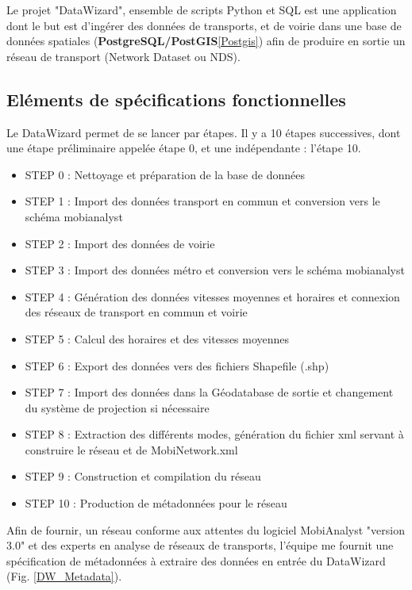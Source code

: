\begin{itemize}
Le projet "DataWizard", ensemble de scripts Python et SQL est une application dont le but est d'ingérer des données de transports, et de voirie dans une base de données spatiales (\textbf{PostgreSQL/PostGIS}\ref{Postgis}) afin de produire en sortie un réseau de transport (Network Dataset ou NDS).\\


\subsection{Eléments de spécifications fonctionnelles}

Le DataWizard permet de se lancer par étapes. Il y a 10 étapes successives, dont une étape préliminaire appelée étape 0, et une indépendante : l'étape 10.
\begin{itemize}
\item STEP 0 : Nettoyage et préparation de la base de données
\item STEP 1 : Import des données transport en commun et conversion vers le schéma mobianalyst
\item STEP 2 : Import des données de voirie
\item STEP 3 : Import des données métro et conversion vers le schéma mobianalyst
\item STEP 4 : Génération des données vitesses moyennes et horaires et connexion des réseaux de transport en commun et voirie
\item STEP 5 : Calcul des horaires et des vitesses moyennes
\item STEP 6 : Export des données vers des fichiers Shapefile (.shp)
\item STEP 7 : Import des données dans la Géodatabase de sortie et changement du système de projection si nécessaire
\item STEP 8 : Extraction des différents modes, génération du fichier xml servant à construire le réseau et de MobiNetwork.xml
\item STEP 9 : Construction et compilation du réseau
\item STEP 10 : Production de métadonnées pour le réseau
\end{itemize}

Afin de fournir, un réseau conforme aux attentes du logiciel MobiAnalyst "version 3.0" et des experts en analyse de réseaux de transports, l'équipe me fournit une spécification de métadonnées à extraire des données en entrée du DataWizard (Fig. \ref{DW_Metadata}).\\


\end{itemize}
